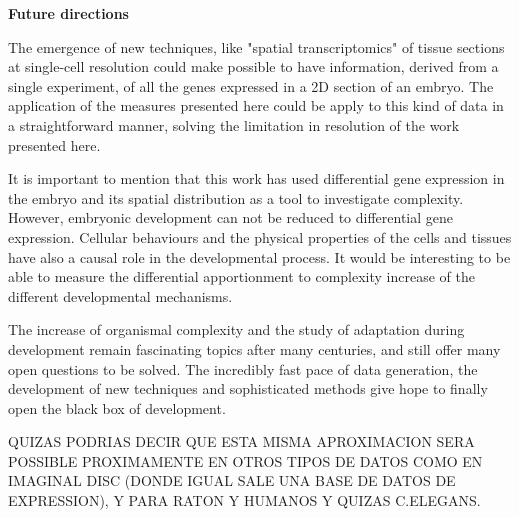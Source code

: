 

\textbf{Future directions}

The emergence of new techniques, like "spatial transcriptomics" of tissue sections at single-cell resolution \citep{Stahl2016} could make possible to have information, derived from a single experiment, of all the genes expressed in a 2D section of an embryo. The application of the measures presented here could be apply to this kind of data in a straightforward manner, solving the limitation in resolution of the work presented here.

It is important to mention that this work has used differential gene expression in the embryo and its spatial distribution as a tool to investigate complexity. However, embryonic development can not be reduced to differential gene expression. Cellular behaviours and the physical properties of the cells and tissues have also a causal role in the developmental process. It would be interesting to be able to measure the differential apportionment to complexity increase of the different developmental mechanisms.


The increase of organismal complexity and the study of adaptation during development remain fascinating topics after many centuries, and still offer many open questions to be solved. The incredibly fast pace of data generation, the development of new techniques and sophisticated methods give hope to finally open the black box of development.

QUIZAS PODRIAS DECIR QUE ESTA MISMA APROXIMACION SERA POSSIBLE PROXIMAMENTE EN OTROS TIPOS DE DATOS COMO EN IMAGINAL DISC (DONDE IGUAL SALE UNA BASE DE DATOS DE EXPRESSION), Y PARA RATON Y HUMANOS Y QUIZAS C.ELEGANS.

